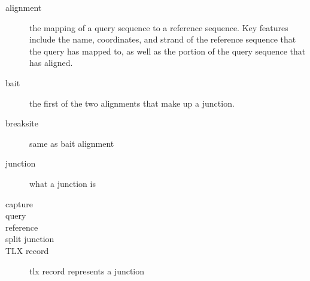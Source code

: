 \documentclass{article}
\begin{document}
\begin{description}

  \item[alignment] the mapping of a query sequence to a reference sequence. Key features include the name, coordinates, and strand of the reference sequence that the query has mapped to, as well as the portion of the query sequence that has aligned.
  \item[bait] the first of the two alignments that make up a junction.
  \item[breaksite] same as bait alignment
  \item[junction] what a junction is
  \item[capture]
  \item[query]
  \item[reference]
  \item[split junction]
  \item[TLX record] tlx record represents a junction

\end{description}
\end{document}
